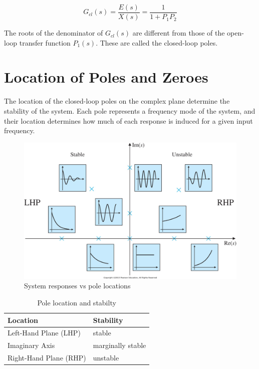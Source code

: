 \documentclass[10pt,conference,compsoc]{IEEEtran}
\begin{document}
\begin{equation}
  G_{cl}(s) = \frac{E(s)}{X(s)} = \frac{1}{1 + P_1 P_2}
\end{equation}

The roots of the denominator of $G_{cl}(s)$ are different from those of the
open-loop transfer function $P_1(s)$. These are called the closed-loop poles.

\section{Location of Poles and Zeroes}

The location of the closed-loop poles on the complex plane determine the
stability of the \gls{system}. Each pole represents a frequency mode of the
\gls{system}, and their location determines how much of each response is induced
for a given input frequency.

\begin{figure}[H]
  \includegraphics[width=\linewidth]{figs/ResponseVsPoleLocations.png}
  \caption{System responses vs pole locations \cite{bib:pole_locations}}
\end{figure}

\begin{table}[ht]
  \caption{Pole location and stabilty}
  \renewcommand{\arraystretch}{1.5}
  \centering
  \begin{tabular}{|ll|}
    \hline
    \textbf{Location} & \textbf{Stability} \\
    \hline
    Left-Hand Plane (LHP) & stable \\
    Imaginary Axis & marginally stable \\
    Right-Hand Plane (RHP) & unstable \\
    \hline
  \end{tabular}
  \label{tab:pole_locations}
\end{table}
\end{document}
